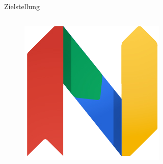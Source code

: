 \documentclass[hyphens]{beamer}
\begin{document}
\begin{frame}{Zielstellung}
\begin{columns}[T]
\begin{column}{0.33\textwidth}
\begin{figure}
\includegraphics[width=\textwidth]{pics/playn-logo.png}
\end{figure}
\end{column}
\end{columns}
 \end{frame}
 
\end{document}
